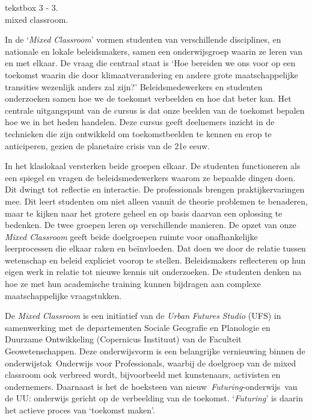 \documentclass{jote-book}
\begin{document}
	\begin{bookbox}{\raggedright tekstbox 3 - 3. \\mixed classroom.}
		In de ‘\emph{Mixed Classroom}' vormen studenten van verschillende disciplines, en nationale en lokale beleidsmakers, samen een onderwijsgroep waarin ze leren van en met elkaar. De vraag die centraal staat is ‘Hoe bereiden we ons voor op een toekomst waarin die door klimaatverandering en andere grote maatschappelijke transities wezenlijk anders zal zijn?' Beleidsmedewerkers en studenten onderzoeken samen hoe we de toekomst verbeelden en hoe dat beter kan. Het centrale uitgangspunt van de cursus is dat onze beelden van de toekomst bepalen hoe we in het heden handelen. Deze cursus geeft deelnemers inzicht in de technieken die zijn ontwikkeld om toekomstbeelden te kennen en erop te anticiperen, gezien de planetaire crisis van de 21e eeuw.

		\vspace*{\baselineskip}

		In het klaslokaal versterken beide groepen elkaar. De studenten functioneren als een spiegel en vragen de beleidsmedewerkers waarom ze bepaalde dingen doen. Dit dwingt tot reflectie en interactie. De professionals brengen praktijkervaringen mee. Dit leert studenten om niet alleen vanuit de theorie problemen te benaderen, maar te kijken naar het grotere geheel en op basis daarvan een oplossing te bedenken. De twee groepen leren op verschillende manieren. De opzet van onze \emph{Mixed Classroom} geeft beide doelgroepen ruimte voor onafhankelijke leerprocessen die elkaar raken en beïnvloeden. Dat doen we door de relatie tussen wetenschap en beleid expliciet voorop te stellen. Beleidsmakers reflecteren op hun eigen werk in relatie tot nieuwe kennis uit onderzoeken. De studenten denken na hoe ze met hun academische training kunnen bijdragen aan complexe maatschappelijke vraagstukken.

		\vspace*{\baselineskip}

		De \emph{Mixed Classroom} is een initiatief van de \emph{Urban }\emph{Futures}\emph{ Studio} (UFS) in samenwerking met de departementen Sociale Geografie en Planologie en Duurzame Ontwikkeling (Copernicus Instituut) van de Faculteit Geowetenschappen. Deze onderwijsvorm is een belangrijke vernieuwing binnen de onderwijstak Onderwijs voor Professionals, waarbij de doelgroep van de mixed classroom ook verbreed wordt, bijvoorbeeld met kunstenaars, activisten en ondernemers. Daarnaast is het de hoeksteen van nieuw \emph{Futuring}-onderwijs van de UU: onderwijs gericht op de verbeelding van de toekomst. ‘\emph{Futuring}' is daarin het actieve proces van ‘toekomst maken'.
	\end{bookbox}
\end{document}
